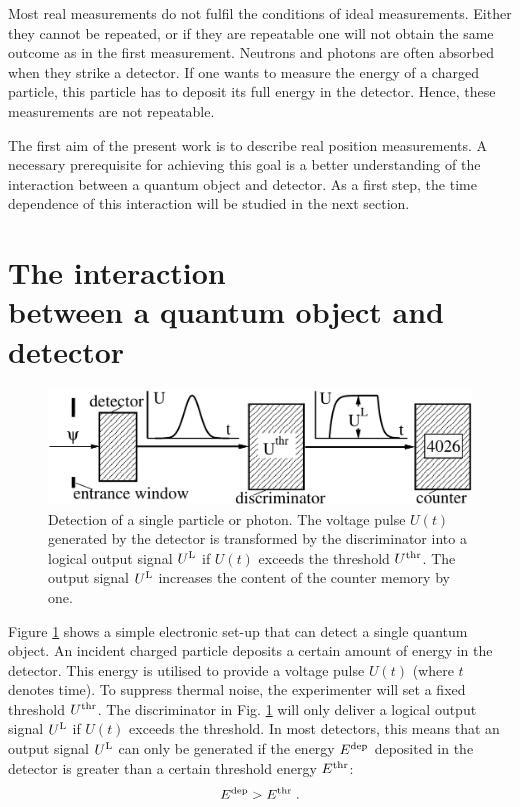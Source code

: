 \documentclass[11pt,a4paper]{article}
\begin{document}
Most real measurements do not fulfil the conditions of ideal measurements.  
Either they cannot be repeated, or if they are repeatable one will not obtain the same outcome as in the first measurement.  
Neutrons and photons are often absorbed when they strike a detector.  
If one wants to measure the energy of a charged particle, this particle has to deposit its full energy in the detector.  
Hence, these measurements are not repeatable.  

The first aim of the present work is to describe real position measurements.  
A necessary prerequisite for achieving this goal is a better understanding of the interaction between a quantum object and detector.  As a first step, the time dependence of this interaction will be studied in the next section.   


\section{The interaction \\ between a quantum object and detector}\label{ch_qo-det} 

\begin{figure}[ht]                                      
\centering
\includegraphics[width=11.5cm]{pos-meas-1.pdf}
\caption{Detection of a single particle or photon.  The voltage pulse $U(t)$ generated by the detector is transformed by the discriminator into a logical output signal $U^{\rm L}$ if $U(t)$ exceeds the threshold $U^{\rm thr}$.  
The output signal $U^{\rm L}$ increases the content of the counter memory by one.}\label{rAbb_pos-meas}   
\end{figure}

Figure \ref{rAbb_pos-meas} shows a simple electronic set-up that can detect a single quantum object.  An incident charged particle deposits a certain amount of energy in the detector.  
This energy is utilised to provide a voltage pulse $U(t)$ (where $t$ denotes time).  
To suppress thermal noise, the experimenter will set a fixed threshold $U^{\rm thr}$. The discriminator in Fig. \ref{rAbb_pos-meas} will only deliver a logical output signal $U^{\rm L}$ if $U(t)$ exceeds the threshold.  
In most detectors, this means that an output signal $U^{\rm L}$ can only be generated if the energy $E^{\rm dep}$ deposited in the detector is greater than a certain threshold energy $E^{\rm thr}$:  
%
\begin{equation}\label{r_E-thr}   
E^{\rm dep} > E^{\rm thr}  \;.
\end{equation} 
\end{document}
